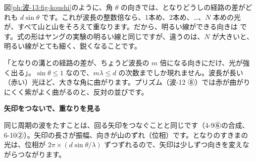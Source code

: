 図\ref{ph:波-13:fig-koushi}のように、角 $\theta$ の向きでは、となりどうしの経路の差がどれも $d\sin\theta$ です。これが波長の整数倍なら、1本め、2本め、…、$N$ 本めの光が、すべて山と山をそろえて重なります。だから、明るい線ができる向きは\label{ph:波-13:koushi}%
です。式の形はヤングの実験の明るい線と同じですが、違うのは、$N$ が大きいと、明るい線がとても細く、鋭くなることです。

\begin{phyomi}[$d\sin\theta=m\lambda$]
「となりの溝との経路の差が、ちょうど波長の $m$ 倍になる向きにだけ、光が強く出る」。$\sin\theta\le1$ なので、$m\lambda\le d$ の次数までしか現れません。波長が長い（赤い）光ほど、大きな角に曲がります。プリズム（波-12 ⑧）では赤が曲がりにくく紫がよく曲がるのと、反対の並びです。
\end{phyomi}

\noindent\textbf{矢印をつないで、重なりを見る}\par\nobreak
同じ周期の波をたすことは、回る矢印をつなぐことと同じです（4-9⑥の合成、6-10②）。矢印の長さが振幅、向きが山のずれ（位相）です。となりのすきまの光は、位相が $2\pi\times(d\sin\theta/\lambda)$ ずつずれるので、矢印は少しずつ向きを変えながらつながります。

